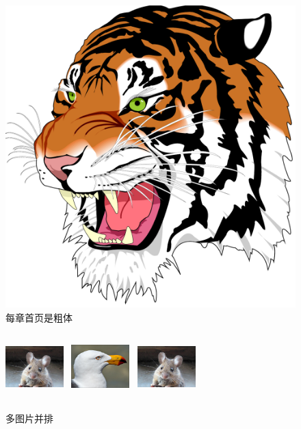 \documentclass[fancyhdr,adobefonts,oneside,hyperref,openany,a4paper,UTF8]{ctexbook}
\begin{document}
\begin{figure}[htp]
  \centering
    \includegraphics[scale=0.25]{img/tiger}
    \caption{每章首页是粗体}
    \label{fig:tiger}
\end{figure}

\begin{figure}[htp]
  \centering
    \includegraphics[width=0.2\textwidth,height=2.5cm]{img/mouse}~
    \includegraphics[width=0.2\textwidth,height=2.5cm]{img/gull}~
    \includegraphics[width=0.2\textwidth,height=2.5cm]{img/mouse}
    \caption{多图片并排}
    \label{fig:tiger}
\end{figure}
\end{document}
